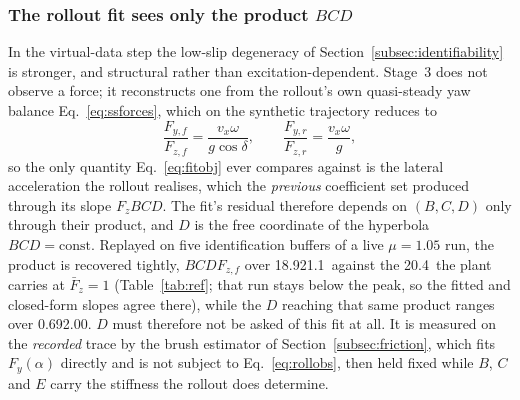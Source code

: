 \documentclass[lineno,12pt]{sn-jnl}
\makeatletter
\newif\ifsiu@prev
\DeclareRobustCommand{\siu@sep}{\ifsiu@prev\,\fi}
\DeclareRobustCommand{\siu@unit}[1]{\siu@sep\text{#1}\siu@prevtrue}
\DeclareRobustCommand{\siu@pre}[1]{\siu@sep\text{#1}\siu@prevfalse}
\DeclareRobustCommand{\siu@div}[1]{\text{#1}\siu@prevfalse}
\DeclareRobustCommand{\meter}{m}
\DeclareRobustCommand{\second}{s}
\DeclareRobustCommand{\gram}{g}
\DeclareRobustCommand{\newton}{N}
\DeclareRobustCommand{\radian}{rad}
\DeclareRobustCommand{\hertz}{Hz}
\DeclareRobustCommand{\percent}{\%}
\DeclareRobustCommand{\g}{\textit{g}}
\DeclareRobustCommand{\kilo}{k}
\DeclareRobustCommand{\milli}{m}
\DeclareRobustCommand{\per}{/}
\DeclareRobustCommand{\squared}{\ensuremath{^{2}}}
\providecommand{\degree}{\ensuremath{^{\circ}}}
\DeclareRobustCommand{\si}[1]{\begingroup
  \siu@prevfalse
  \renewcommand{\meter}{\siu@unit{m}}%
  \renewcommand{\second}{\siu@unit{s}}%
  \renewcommand{\gram}{\siu@unit{g}}%
  \renewcommand{\newton}{\siu@unit{N}}%
  \renewcommand{\radian}{\siu@unit{rad}}%
  \renewcommand{\hertz}{\siu@unit{Hz}}%
  \renewcommand{\percent}{\siu@unit{\%}}%
  \renewcommand{\degree}{\siu@unit{\ensuremath{^{\circ}}}}%
  \renewcommand{\g}{\siu@unit{\textit{g}}}%
  \renewcommand{\kilo}{\siu@pre{k}}%
  \renewcommand{\milli}{\siu@pre{m}}%
  \renewcommand{\per}{\siu@div{/}}%
  \renewcommand{\squared}{\ensuremath{^{2}}}%
  #1\endgroup}
\DeclareRobustCommand{\num}[1]{#1}
\DeclareRobustCommand{\numrange}[2]{#1\text{--}#2}
\DeclareRobustCommand{\SI}[2]{#1\,\si{#2}}
\DeclareRobustCommand{\SIrange}[3]{#1\text{--}#2\,\si{#3}}
\theoremstyle{thmstyleone}%
\theoremstyle{thmstyletwo}%
\theoremstyle{thmstylethree}%
\makeatother
\begin{document}
\subsubsection{The rollout fit sees only the product $BCD$}
\label{subsec:bcd}
In the virtual-data step the low-slip degeneracy of
Section~\ref{subsec:identifiability} is stronger, and structural rather than
excitation-dependent. Stage~3 does not observe a force; it reconstructs one from
the rollout's own quasi-steady yaw balance Eq.~\eqref{eq:ssforces}, which on the
synthetic trajectory reduces to
\begin{equation}
\frac{F_{y,f}}{F_{z,f}}=\frac{v_{x}\omega}{g\cos\delta},\qquad
\frac{F_{y,r}}{F_{z,r}}=\frac{v_{x}\omega}{g},
\label{eq:rollobs}
\end{equation}
so the only quantity Eq.~\eqref{eq:fitobj} ever compares against is the lateral
acceleration the rollout realises, which the \emph{previous} coefficient set
produced through its slope $F_{z}BCD$. The fit's residual therefore
depends on $(B,C,D)$ only through their product, and $D$ is the free coordinate
of the hyperbola $BCD=\mathrm{const}$. Replayed on five identification buffers
of a live $\mu=\num{1.05}$ run, the product is recovered tightly, $BCDF_{z,f}$
over \SIrange{18.9}{21.1}{\kilo\newton\per\radian} against the
\SI{20.4}{\kilo\newton\per\radian} the plant carries at $\bar F_{z}=1$
(Table~\ref{tab:ref}; that run stays below the peak, so the fitted and
closed-form slopes agree there), while the $D$ reaching that same product
ranges over \numrange{0.69}{2.00}. $D$ must therefore not be asked of this fit
at all. It is measured on the \emph{recorded} trace by the brush estimator of
Section~\ref{subsec:friction}, which fits $F_{y}(\alpha)$ directly and is not
subject to Eq.~\eqref{eq:rollobs}, then held fixed while $B$, $C$ and $E$ carry the
stiffness the rollout does determine.
\end{document}
